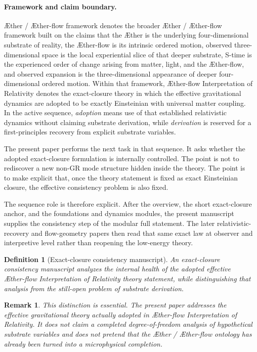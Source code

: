 \documentclass[11pt]{article}
\newcommand{\Aether}{\AE{}ther}
\newcommand{\Aflow}{\AE{}ther-flow}
\newcommand{\TheoryName}{\Aflow{} Interpretation of Relativity}
\newcommand{\TheoryProgram}{\Aether{} / \Aflow{} framework}
\newtheorem{definition}{Definition}
\newtheorem{remark}{Remark}
\begin{document}
\paragraph{Framework and claim boundary.}
\TheoryProgram{} denotes the broader \Aether{} / \Aflow{} framework built on the claims that the \Aether{} is the underlying four-dimensional substrate of reality, the \Aflow{} is its intrinsic ordered motion, observed three-dimensional space is the local experiential slice of that deeper substrate, S-time is the experienced order of change arising from matter, light, and the \Aflow{}, and observed expansion is the three-dimensional appearance of deeper four-dimensional ordered motion. Within that framework, \TheoryName{} denotes the exact-closure theory in which the effective gravitational dynamics are adopted to be exactly Einsteinian with universal matter coupling. In the active sequence, \emph{adoption} means use of that established relativistic dynamics without claiming substrate derivation, while \emph{derivation} is reserved for a first-principles recovery from explicit substrate variables.

The present paper performs the next task in that sequence. It asks whether the adopted exact-closure formulation is internally controlled. The point is not to rediscover a new non-GR mode structure hidden inside the theory. The point is to make explicit that, once the theory statement is fixed as exact Einsteinian closure, the effective consistency problem is also fixed.

The sequence role is therefore explicit. After the overview, the short exact-closure anchor, and the foundations and dynamics modules, the present manuscript supplies the consistency step of the modular full statement. The later relativistic-recovery and flow-geometry papers then read that same exact law at observer and interpretive level rather than reopening the low-energy theory.

\begin{definition}[Exact-closure consistency manuscript]
An exact-closure consistency manuscript analyzes the internal health of the adopted effective \TheoryName{} theory statement, while distinguishing that analysis from the still-open problem of substrate derivation.
\end{definition}

\begin{remark}
This distinction is essential. The present paper addresses the effective gravitational theory actually adopted in \TheoryName{}. It does not claim a completed degree-of-freedom analysis of hypothetical substrate variables and does not pretend that the \Aether{} / \Aflow{} ontology has already been turned into a microphysical completion.
\end{remark}
\end{document}
